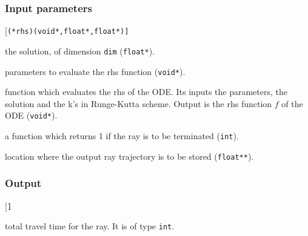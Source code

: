 \subsubsection*{Input parameters}
\begin{desclist}{\tt }{\quad}[\tt (*rhs)(void*,float*,float*)]
   \setlength\itemsep{0pt}
   \item[y]   the solution, of dimension \texttt{dim} (\texttt{float*}).  
   \item[par] parameters to evaluate the rhs function (\texttt{void*}).  
   \item[(*rhs)(void*,float*,float*)] function which evaluates the rhs of the ODE. Its inputs the parameters, the solution and the k's in Runge-Kutta scheme. Output is the rhs function $f$ of the ODE (\texttt{void*}).
   \item[(*term)(void*,float*)] a function which returns 1 if the ray is to be terminated (\texttt{int}). 
   \item[traj] location where the output ray trajectory is to be stored (\texttt{float**}).  
\end{desclist}

\subsubsection*{Output}
\begin{desclist}{\tt }{\quad}[\tt ]
   \setlength\itemsep{0pt}
   \item[t1] total travel time for the ray. It is of type \texttt{int}.
\end{desclist}






